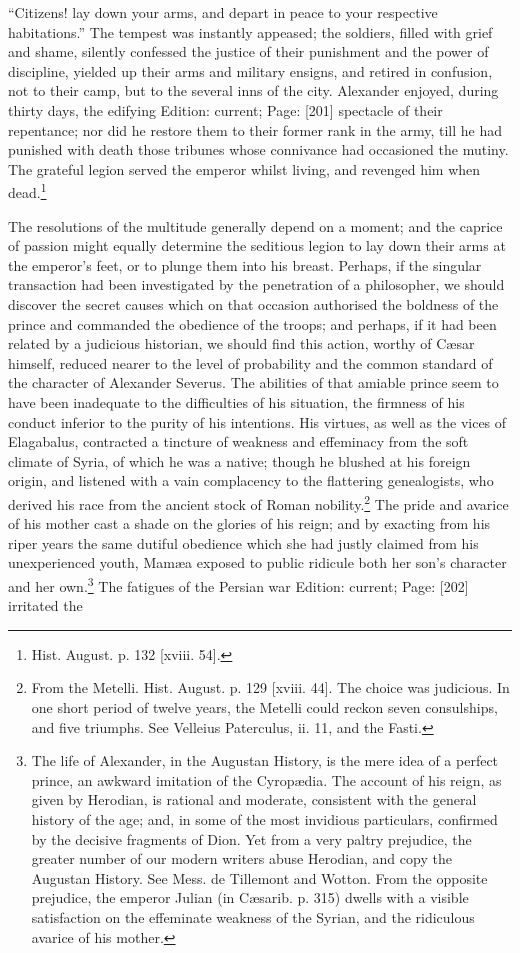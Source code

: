 \texthebrew{“}Citizens! lay down your arms, and depart in peace to your respective habitations.\texthebrew{}” The tempest was instantly appeased; the soldiers, filled with grief and shame, silently confessed the justice of their punishment and the power of discipline, yielded up their arms and military ensigns, and retired in confusion, not to their camp, but to the several inns of the city. Alexander enjoyed, during thirty days, the edifying Edition: current; Page: [201] spectacle of their repentance; nor did he restore them to their former rank in the army, till he had punished with death those tribunes whose connivance had occasioned the mutiny. The grateful legion served the emperor whilst living, and revenged him when dead.\footnote{Hist. August. p. 132 [xviii. 54].}

The resolutions of the multitude generally depend on a moment; and the caprice of passion might equally determine the seditious legion to lay down their arms at the emperor\texthebrew{}’s feet, or to plunge them into his breast. Perhaps, if the singular transaction had been investigated by the penetration of a philosopher, we should discover the secret causes which on that occasion authorised the boldness of the prince and commanded the obedience of the troops; and perhaps, if it had been related by a judicious historian, we should find this action, worthy of Cæsar himself, reduced nearer to the level of probability and the common standard of the character of Alexander Severus. The abilities of that amiable prince seem to have been inadequate to the difficulties of his situation, the firmness of his conduct inferior to the purity of his intentions. His virtues, as well as the vices of Elagabalus, contracted a tincture of weakness and effeminacy from the soft climate of Syria, of which he was a native; though he blushed at his foreign origin, and listened with a vain complacency to the flattering genealogists, who derived his race from the ancient stock of Roman nobility.\footnote{From the Metelli. Hist. August. p. 129 [xviii. 44]. The choice was judicious. In one short period of twelve years, the Metelli could reckon seven consulships, and five triumphs. See Velleius Paterculus, ii. 11, and the Fasti.} The pride and avarice of his mother cast a shade on the glories of his reign; and by exacting from his riper years the same dutiful obedience which she had justly claimed from his unexperienced youth, Mamæa exposed to public ridicule both her son\texthebrew{}’s character and her own.\footnote{The life of Alexander, in the Augustan History, is the mere idea of a perfect prince, an awkward imitation of the Cyropædia. The account of his reign, as given by Herodian, is rational and moderate, consistent with the general history of the age; and, in some of the most invidious particulars, confirmed by the decisive fragments of Dion. Yet from a very paltry prejudice, the greater number of our modern writers abuse Herodian, and copy the Augustan History. See Mess. de Tillemont and Wotton. From the opposite prejudice, the emperor Julian (in Cæsarib. p. 315) dwells with a visible satisfaction on the effeminate weakness of the Syrian, and the ridiculous avarice of his mother.} The fatigues of the Persian war Edition: current; Page: [202] irritated the 